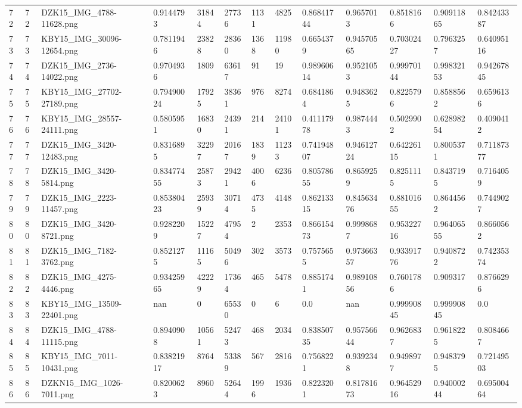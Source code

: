 \documentclass[11pt, a4paper, twoside]{report}
\begin{document}
\begin{longtable}[c]{@{}lllllllllllll@{}}
72 & 72 & DZK15\_IMG\_4788-11628.png & 0.9144793 & 31844 & 27736 & 1131 & 4825 & 0.86841744 & 0.9657013 & 0.8518166 & 0.90911865 & 0.84243387 \\
73 & 73 & KBY15\_IMG\_30096-12654.png & 0.7811946 & 23828 & 28360 & 1368 & 11980 & 0.6654379 & 0.94570565 & 0.70302427 & 0.7963257 & 0.64095116 \\
74 & 74 & DZK15\_IMG\_2736-14022.png & 0.9704936 & 1809 & 63617 & 91 & 19 & 0.98960614 & 0.9521053 & 0.99970144 & 0.99832153 & 0.94267845 \\
75 & 75 & KBY15\_IMG\_27702-27189.png & 0.79490024 & 17925 & 38361 & 976 & 8274 & 0.6841864 & 0.9483625 & 0.8225796 & 0.8588562 & 0.6596136 \\
76 & 76 & KBY15\_IMG\_28557-24111.png & 0.5805951 & 16830 & 24391 & 214 & 24101 & 0.41117978 & 0.9874443 & 0.5029902 & 0.62898254 & 0.4090412 \\
77 & 77 & DZK15\_IMG\_3420-12483.png & 0.8316895 & 32297 & 20167 & 1839 & 11233 & 0.74194807 & 0.94612724 & 0.64226115 & 0.8005371 & 0.71187377 \\
78 & 78 & DZK15\_IMG\_3420-5814.png & 0.83477455 & 25873 & 29421 & 4006 & 6236 & 0.80578655 & 0.8659259 & 0.8251115 & 0.8437195 & 0.7164059 \\
79 & 79 & DZK15\_IMG\_2223-11457.png & 0.85380423 & 25939 & 30714 & 4735 & 4148 & 0.86213315 & 0.84563476 & 0.88101655 & 0.8644562 & 0.7449027 \\
80 & 80 & DZK15\_IMG\_3420-8721.png & 0.9282209 & 15227 & 47954 & 2 & 2353 & 0.86615473 & 0.9998687 & 0.95322716 & 0.96406555 & 0.8660562 \\
81 & 81 & DZK15\_IMG\_7182-3762.png & 0.8521275 & 11165 & 50496 & 302 & 3573 & 0.7575655 & 0.97366357 & 0.93391776 & 0.9408722 & 0.74235374 \\
82 & 82 & DZK15\_IMG\_4275-4446.png & 0.93425965 & 42229 & 17364 & 465 & 5478 & 0.8851741 & 0.98910856 & 0.7601786 & 0.909317 & 0.8766296 \\
83 & 83 & KBY15\_IMG\_13509-22401.png & nan & 0 & 65530 & 0 & 6 & 0.0 & nan & 0.99990845 & 0.99990845 & 0.0 \\
84 & 84 & DZK15\_IMG\_4788-11115.png & 0.8940908 & 10561 & 52473 & 468 & 2034 & 0.83850735 & 0.95756644 & 0.9626837 & 0.9618225 & 0.8084667 \\
85 & 85 & KBY15\_IMG\_7011-10431.png & 0.83821917 & 8764 & 53389 & 567 & 2816 & 0.7568221 & 0.9392348 & 0.9498977 & 0.9483795 & 0.72149503 \\
86 & 86 & DZKN15\_IMG\_1026-7011.png & 0.8200623 & 8960 & 52644 & 1996 & 1936 & 0.8223201 & 0.81781673 & 0.96452916 & 0.94000244 & 0.69500464 \\

\end{longtable}
\end{document}

